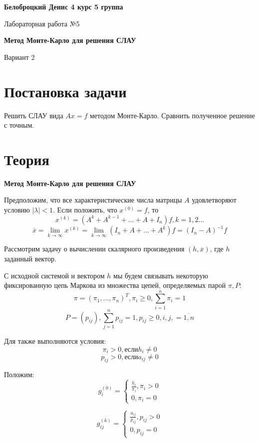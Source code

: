 \documentclass[12pt]{article}
\begin{document}
\textbf{Белоброцкий Денис 4 курс 5 группа}
\\
\begin{center}
	{\Large Лабораторная работа №5}
\end{center} 
\begin{center}
	{\large \textbf{Метод Монте-Карло для решения СЛАУ}}
\end{center} 
\begin{center}
	Вариант 2
\end{center}

	\section*{Постановка задачи}
	\par Решить СЛАУ вида $ Ax=f $ методом Монте-Карло. Сравнить полученное решение с точным.
	\section*{Теория}
	\par \textbf{Метод Монте-Карло для решения СЛАУ} 
	\par Предположим, что все характеристические числа матрицы $ A $ удовлетворяют условию $ |\lambda| < 1 $. Если положить, что $ x^{(0)} = f $, то 
	$$ x^{(k)} = (A^k + A^{k-1} + ... + A + I_n)f, k=1,2... $$
	$$ \overline{x} = \lim\limits_{k\to \infty} x^{(k)} = \lim\limits_{k\to \infty} (I_n + A + ... + A^k)f = (I_n - A)^{-1}f $$
	\par Рассмотрим задачу о вычислении скалярного произведения $ (h, \overline{x}) $, где $ h $ заданный вектор.
	\par С исходной системой и вектором $ h $ мы будем связывать некоторую фиксированную цепь Маркова из множества цепей, определяемых парой $ {\pi, P} $:
	$$ \pi = (\pi_1,...,\pi_n)^T, \pi_i \geq 0, \sum\limits_{i=1}^n \pi_i = 1 $$
	$$ P = (p_{ij}), \sum\limits_{j=1}^n p_{ij} = 1, p_{ij} \geq 0, i, j, =\overline{1, n} $$
	\par Для также выполняются условия:
	$$ \pi_i > 0, если h_i \neq 0 $$
	$$ p_{ij} > 0, если a_{ij} \neq 0 $$
	\par Положим:
	$$ 
		g_i^{(0)} = 
		\begin{cases}
			\frac{h_i}{\pi_i}, \pi_i > 0 \\
			0, \pi_i = 0
		\end{cases}
	$$
	
	$$
		g_{ij}^{(k)} = 
		\begin{cases}
			\frac{a_{ij}}{p_{ij}}, p_{ij} > 0 \\
			0, p_{ij} = 0 
		\end{cases}	
	$$
	
\end{document}
